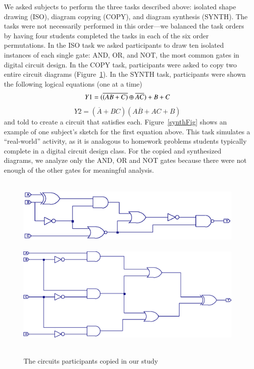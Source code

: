 \documentclass[final,5p,twocolumn]{elsarticle}
\begin{document}
We asked subjects to perform the three tasks described above: isolated
shape drawing (ISO), diagram copying (COPY), and diagram synthesis
(SYNTH).  The tasks were not necessarily performed in this order---we
balanced the task orders by having four 
students completed the tasks in each of the six order permutations.
In the ISO task we asked participants to draw ten isolated
instances of each single gate: AND, OR, and NOT, the most common gates
in digital circuit design.  In the COPY task, participants were asked
to copy two entire circuit diagrams (Figure~\ref{copyFig}).  In the
SYNTH task, participants were shown the following logical equations
(one at a time)
\[
Y1 = (\overline{(AB+C)}\oplus\overline{AC})+B+C \\
\]
\[
Y2 = (\overline{A}+BC)(A\overline{B}+AC+B)
\]
and told to create a circuit that satisfies each.  
Figure~\ref{synthFig} shows an example of one subject's
sketch for the first equation above.  
This task
simulates a ``real-world'' activity, as it is analogous to homework
problems students typically complete in a digital circuit design
class.  
For the copied and synthesized diagrams, we analyze only the AND,
OR and NOT gates because there were not enough of the other gates for
meaningful analysis.  

\begin{figure}
\mbox{ \includegraphics[width=1.0\hsize]{circuit_1.eps} }
\mbox{ \includegraphics[width=1.0\hsize]{circuit_2.eps} }
\caption{The circuits participants copied in our study}
\label{copyFig}
\end{figure}
\end{document}
